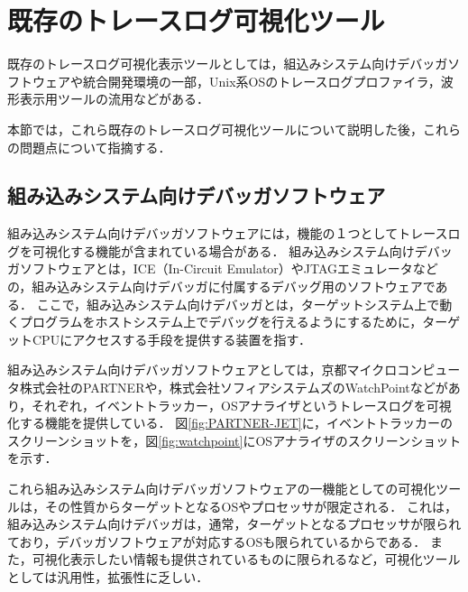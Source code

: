 \section{既存のトレースログ可視化ツール}

既存のトレースログ可視化表示ツールとしては，組込みシステム向けデバッガソフトウェアや統合開発環境の一部，Unix系OSのトレースログプロファイラ，波形表示用ツールの流用などがある．

本節では，これら既存のトレースログ可視化ツールについて説明した後，これらの問題点について指摘する．

\subsection{組み込みシステム向けデバッガソフトウェア}

組み込みシステム向けデバッガソフトウェアには，機能の１つとしてトレースログを可視化する機能が含まれている場合がある．
組み込みシステム向けデバッガソフトウェアとは，ICE（In-Circuit Emulator）やJTAGエミュレータなどの，組み込みシステム向けデバッガに付属するデバッグ用のソフトウェアである．
ここで，組み込みシステム向けデバッガとは，ターゲットシステム上で動くプログラムをホストシステム上でデバッグを行えるようにするために，ターゲットCPUにアクセスする手段を提供する装置を指す．

組み込みシステム向けデバッガソフトウェアとしては，京都マイクロコンピュータ株式会社のPARTNER\cite{PARTNER-JET}や，株式会社ソフィアシステムズのWatchPoint\cite{watchpoint}などがあり，それぞれ，イベントトラッカー，OSアナライザというトレースログを可視化する機能を提供している．
図\ref{fig:PARTNER-JET}に，イベントトラッカーのスクリーンショットを，図\ref{fig:watchpoint}にOSアナライザのスクリーンショットを示す．

これら組み込みシステム向けデバッガソフトウェアの一機能としての可視化ツールは，その性質からターゲットとなるOSやプロセッサが限定される．
これは，組み込みシステム向けデバッガは，通常，ターゲットとなるプロセッサが限られており，デバッガソフトウェアが対応するOSも限られているからである．
また，可視化表示したい情報も提供されているものに限られるなど，可視化ツールとしては汎用性，拡張性に乏しい．

